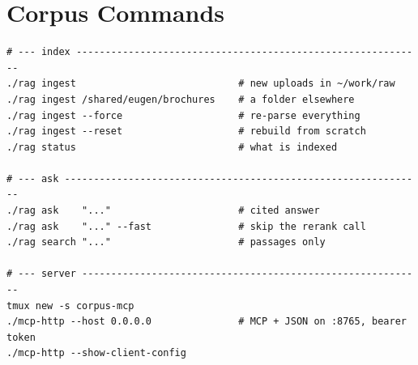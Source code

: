 \documentclass[11pt,a4paper]{article}
\begin{document}
\section{Corpus Commands}

\begin{lstlisting}
# --- index ------------------------------------------------------------
./rag ingest                            # new uploads in ~/work/raw
./rag ingest /shared/eugen/brochures    # a folder elsewhere
./rag ingest --force                    # re-parse everything
./rag ingest --reset                    # rebuild from scratch
./rag status                            # what is indexed

# --- ask --------------------------------------------------------------
./rag ask    "..."                      # cited answer
./rag ask    "..." --fast               # skip the rerank call
./rag search "..."                      # passages only

# --- server -----------------------------------------------------------
tmux new -s corpus-mcp
./mcp-http --host 0.0.0.0               # MCP + JSON on :8765, bearer token
./mcp-http --show-client-config
\end{lstlisting}
\end{document}
